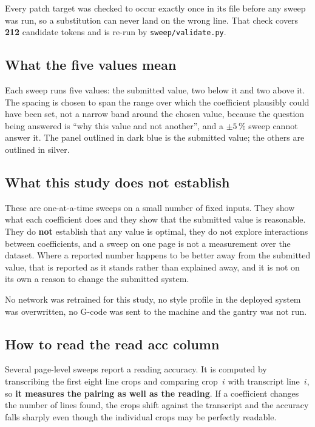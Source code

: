\documentclass[11pt,a4paper]{article}
\begin{document}
Every patch target was checked to occur exactly once in its file before any
sweep was run, so a substitution can never land on the wrong line. That check
covers \textbf{212} candidate tokens and is re-run by
\texttt{sweep/validate.py}.

\subsection{What the five values mean}

Each sweep runs five values: the submitted value, two below it and two above it.
The spacing is chosen to span the range over which the coefficient plausibly
could have been set, not a narrow band around the chosen value, because the
question being answered is \enquote{why this value and not another}, and a
$\pm 5\,\%$ sweep cannot answer it. The panel outlined in dark blue is the
submitted value; the others are outlined in silver.

\subsection{What this study does not establish}

These are one-at-a-time sweeps on a small number of fixed inputs. They show what
each coefficient does and they show that the submitted value is reasonable.
They do \textbf{not} establish that any value is optimal, they do not explore
interactions between coefficients, and a sweep on one page is not a measurement
over the dataset. Where a reported number happens to be better away from the
submitted value, that is reported as it stands rather than explained away, and
it is not on its own a reason to change the submitted system.

No network was retrained for this study, no style profile in the deployed
system was overwritten, no G-code was sent to the machine and the gantry was not
run.

\subsection{How to read the \textsf{read acc} column}
\label{sec:readacc}

Several page-level sweeps report a reading accuracy. It is computed by
transcribing the first eight line crops and comparing crop~$i$ with transcript
line~$i$, so \textbf{it measures the pairing as well as the reading}. If a
coefficient changes the number of lines found, the crops shift against the
transcript and the accuracy falls sharply even though the individual crops may
be perfectly readable.
\end{document}
